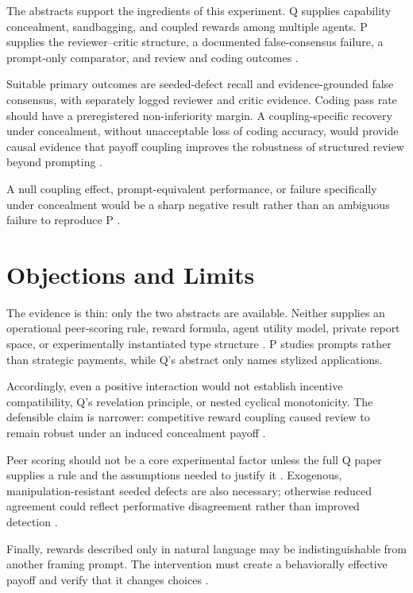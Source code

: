 \documentclass{article}
\begin{document}
The abstracts support the ingredients of this experiment. Q supplies capability concealment, sandbagging, and coupled rewards among multiple agents. P supplies the reviewer--critic structure, a documented false-consensus failure, a prompt-only comparator, and review and coding outcomes .

Suitable primary outcomes are seeded-defect recall and evidence-grounded false consensus, with separately logged reviewer and critic evidence. Coding pass rate should have a preregistered non-inferiority margin. A coupling-specific recovery under concealment, without unacceptable loss of coding accuracy, would provide causal evidence that payoff coupling improves the robustness of structured review beyond prompting .

A null coupling effect, prompt-equivalent performance, or failure specifically under concealment would be a sharp negative result rather than an ambiguous failure to reproduce P .

\section{Objections and Limits}

The evidence is thin: only the two abstracts are available. Neither supplies an operational peer-scoring rule, reward formula, agent utility model, private report space, or experimentally instantiated type structure . P studies prompts rather than strategic payments, while Q's abstract only names stylized applications.

Accordingly, even a positive interaction would not establish incentive compatibility, Q's revelation principle, or nested cyclical monotonicity. The defensible claim is narrower: competitive reward coupling caused review to remain robust under an induced concealment payoff .

Peer scoring should not be a core experimental factor unless the full Q paper supplies a rule and the assumptions needed to justify it . Exogenous, manipulation-resistant seeded defects are also necessary; otherwise reduced agreement could reflect performative disagreement rather than improved detection .

Finally, rewards described only in natural language may be indistinguishable from another framing prompt. The intervention must create a behaviorally effective payoff and verify that it changes choices .
\end{document}
